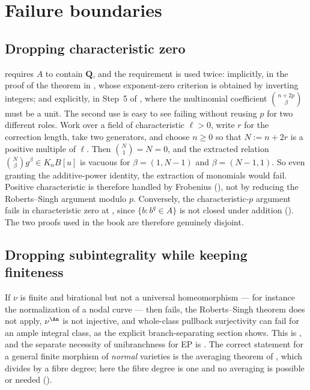 \section{Failure boundaries}
\label{sec:ch44-failure}

\subsection{Dropping characteristic zero}
\label{sec:ch44-failure-charp}

 requires $A$ to contain $\mathbf Q$, and
the requirement is used twice: implicitly, in the proof of the theorem in
\cite{RobertsSingh}, whose exponent-zero criterion is obtained by inverting
integers; and explicitly, in Step~5 of
, where the multinomial coefficient
$\binom{n+2p}\beta$ must be a unit.  The second use is easy to see
failing without reusing $p$ for two different roles.  Work over a field
of characteristic $\ell>0$, write $r$ for the correction length, take
two generators, and choose $n\ge0$ so that
$N:=n+2r$ is a positive multiple of $\ell$.  Then
$\binom N1=N=0$, and the extracted relation
$\binom N\beta g^\beta\in K_nB[u]$ is vacuous for
$\beta=(1,N-1)$ and $\beta=(N-1,1)$.  So even granting the additive-power
identity, the extraction of monomials would fail.  Positive characteristic
is therefore handled by Frobenius
(), not by reducing the
Roberts--Singh argument modulo $p$.  Conversely, the
characteristic-$p$ argument fails in characteristic zero at
, since $\{b:b^q\in A\}$ is not closed
under addition ().  The two proofs used in
the book are therefore genuinely disjoint.

\subsection{Dropping subintegrality while keeping finiteness}
\label{sec:ch44-failure-subintegral}

If $\nu$ is finite and birational but not a universal homeomorphism ---
for instance the normalization of a nodal curve --- then
 fails, the Roberts--Singh theorem does
not apply, $\nu^{\An}$ is not injective, and whole-class pullback surjectivity can fail
for an ample integral class, as the explicit branch-separating section
shows.  This is , and the
separate necessity of unibranchness for EP is
.  The correct
statement for a general finite morphism of \emph{normal} varieties is the
averaging theorem of , which divides by a fibre
degree; here the fibre degree is one and no averaging is possible or needed
().

